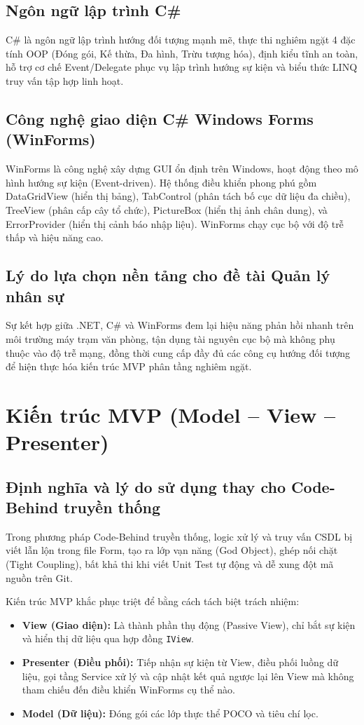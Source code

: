\documentclass[12pt,a4paper]{report}
\begin{document}
\subsection{Ngôn ngữ lập trình C\#}
C\# là ngôn ngữ lập trình hướng đối tượng mạnh mẽ, thực thi nghiêm ngặt 4 đặc tính OOP (Đóng gói, Kế thừa, Đa hình, Trừu tượng hóa), định kiểu tĩnh an toàn, hỗ trợ cơ chế Event/Delegate phục vụ lập trình hướng sự kiện và biểu thức LINQ truy vấn tập hợp linh hoạt.

\subsection{Công nghệ giao diện C\# Windows Forms (WinForms)}
WinForms là công nghệ xây dựng GUI ổn định trên Windows, hoạt động theo mô hình hướng sự kiện (Event-driven). Hệ thống điều khiển phong phú gồm DataGridView (hiển thị bảng), TabControl (phân tách bố cục dữ liệu đa chiều), TreeView (phân cấp cây tổ chức), PictureBox (hiển thị ảnh chân dung), và ErrorProvider (hiển thị cảnh báo nhập liệu). WinForms chạy cục bộ với độ trễ thấp và hiệu năng cao.

\subsection{Lý do lựa chọn nền tảng cho đề tài Quản lý nhân sự}
Sự kết hợp giữa .NET, C\# và WinForms đem lại hiệu năng phản hồi nhanh trên môi trường máy trạm văn phòng, tận dụng tài nguyên cục bộ mà không phụ thuộc vào độ trễ mạng, đồng thời cung cấp đầy đủ các công cụ hướng đối tượng để hiện thực hóa kiến trúc MVP phân tầng nghiêm ngặt.

\section{Kiến trúc MVP (Model -- View -- Presenter)}

\subsection{Định nghĩa và lý do sử dụng thay cho Code-Behind truyền thống}
Trong phương pháp Code-Behind truyền thống, logic xử lý và truy vấn CSDL bị viết lẫn lộn trong file Form, tạo ra lớp vạn năng (God Object), ghép nối chặt (Tight Coupling), bất khả thi khi viết Unit Test tự động và dễ xung đột mã nguồn trên Git.

Kiến trúc MVP khắc phục triệt để bằng cách tách biệt trách nhiệm:
\begin{itemize}[leftmargin=1.0cm]
    \item \textbf{View (Giao diện):} Là thành phần thụ động (Passive View), chỉ bắt sự kiện và hiển thị dữ liệu qua hợp đồng \texttt{IView}.
    \item \textbf{Presenter (Điều phối):} Tiếp nhận sự kiện từ View, điều phối luồng dữ liệu, gọi tầng Service xử lý và cập nhật kết quả ngược lại lên View mà không tham chiếu đến điều khiển WinForms cụ thể nào.
    \item \textbf{Model (Dữ liệu):} Đóng gói các lớp thực thể POCO và tiêu chí lọc.
\end{itemize}
\end{document}
